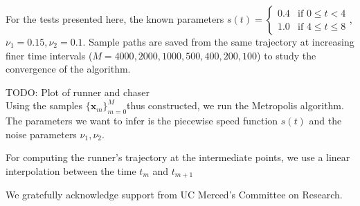 \documentclass[graybox]{svmult}
\begin{document}
For the tests presented here, the known parameters $s(t) =
\left\{
	\begin{array}{ll}
		0.4  & \mbox{if } 0 \leq t < 4 \\
		1.0 & \mbox{if } 4 \leq t \leq 8
	\end{array}
\right.$, $\nu_1 = 0.15, \nu_2 = 0.1$. Sample paths are saved from the same trajectory at increasing finer time intervals ($M = 4000,2000,1000,500,400,200,100$) to study the convergence of the algorithm. 

TODO: Plot of runner and chaser \\

Using the samples $\{\mathbf{x}_m\}^M_{m=0}$thus constructed, we run the Metropolis algorithm. The parameters we want to infer is the piecewise speed function $s(t)$ and the noise parameters $\nu_1, \nu_2$. 

For computing the runner's trajectory at the intermediate points, we use a linear interpolation between the time $t_m$ and $t_{m+1}$

\begin{acknowledgement}
We gratefully acknowledge support from UC Merced's Committee on Research.
\end{acknowledgement}



\end{document}
